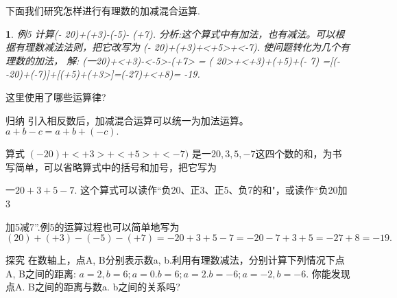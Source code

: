 \documentclass[UTF8]{article}
\newtheorem{example}{ }
\begin{document}
下面我们研究怎样进行有理数的加减混合运算.

\begin{example}
例5 计算(- 20)+(+3)-(-5)- (+7).
分析:这个算式中有加法，也有减法。可以根据有理数减法法则，把它改写为
	(- 20)+(+3)+<+5>+<-7).
使问题转化为几个有理数的加法，
解:  (一20)+<+3)-<-5>-(+7>
	= ( 20>+<+3)+(+5)+(- 7)
	=[(- -20)+(-7)]+[(+5)+(+3>]=(-27)+<+8)= -19.
\end{example}
这里使用了哪些运算律?

归纳
引入相反数后，加减混合运算可以统一为加法运算。
	$a+b-c=a+b+(-c).$	

算式
	$(- 20)+<+3>+<+5>+<-7)$
是$一20, 3, 5, -7$这四个数的和，为书写简单，可以省略算式中的括号和加号，把它写为

	$一20+3+5-7.$
这个算式可以读作“负20、正3、正5、负7的和"，或读作“负20加3

加5减7”.例5的运算过程也可以简单地写为
	$( 20)+(+3)-(-5)- (+7)
	= - 20+3+5-7
	=-20-7+3+5
	=-27+8
	=- 19.$

探究
在数轴上，点A, B分别表示数a, b.利用有理数减法，分别计算下列情况下点A, B之间的距离:
	$a=2, b=6; a=0. b=6; a=2. b=-6; a=-2, b=-6.$
你能发现点A. B之间的距离与数a. b之间的关系吗?
\end{document}
